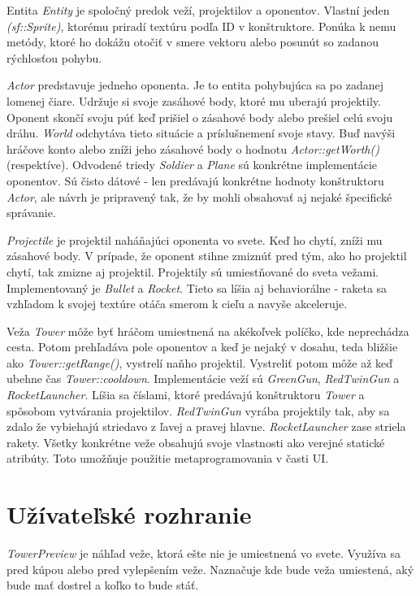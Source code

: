 \documentclass[12pt]{article}
\begin{document}
Entita \emph{Entity} je spoločný predok veží, projektilov a oponentov. Vlastní jeden \emph{(sf::Sprite)}, ktorému
priradí textúru podľa ID v konštruktore. Ponúka k nemu metódy, ktoré ho dokážu otočiť v smere vektoru alebo posunút so zadanou
rýchlosťou pohybu.


\emph{Actor} predstavuje jedneho oponenta. Je to entita pohybujúca sa po zadanej lomenej čiare. Udržuje si svoje zasáhové body, ktoré
mu uberajú projektily. Oponent skončí svoju púť keď prišiel o zásahové body alebo prešiel celú svoju dráhu. \emph{World} odchytáva tieto
situácie a príslušnemení svoje stavy. Buď navýši hráčove konto alebo zníži jeho zásahové body o hodnotu \emph{Actor::getWorth()} (respektíve).
Odvodené triedy \emph{Soldier} a \emph{Plane} sú konkrétne implementácie oponentov. Sú čisto dátové - len predávajú konkrétne hodnoty 
konštruktoru \emph{Actor}, ale návrh je pripravený tak, že by mohli obsahovať aj nejaké špecifické správanie.


\emph{Projectile} je projektil naháňajúci oponenta vo svete. Keď ho chytí, zníži mu zásahové body. V prípade, že oponent stihne zmiznúť
pred tým, ako ho projektil chytí, tak zmizne aj projektil. Projektily sú umiestňované do sveta vežami.
Implementovaný je \emph{Bullet} a \emph{Rocket}. Tieto sa líšia aj behaviorálne - raketa sa vzhľadom k svojej textúre otáča smerom k cieľu
a navyše akceleruje.


Veža \emph{Tower} môže byť hráčom umiestnená na akékoľvek políčko, kde neprechádza cesta. Potom prehľadáva pole oponentov
a keď je nejaký v dosahu, teda bližšie ako \emph{Tower::getRange()}, vystrelí naňho projektil. Vystreliť potom môže až keď
ubehne čas \emph{Tower::cooldown}. Implementácie veží sú \emph{GreenGun}, \emph{RedTwinGun} a \emph{RocketLauncher}. Líšia sa
číslami, ktoré predávajú konštruktoru \emph{Tower} a spôsobom vytvárania projektilov. \emph{RedTwinGun} vyrába projektily tak,
aby sa zdalo že vybiehajú striedavo z ľavej a pravej hlavne. \emph{RocketLauncher} zase striela rakety.
Všetky konkrétne veže obsahujú svoje vlastnosti ako verejné statické atribúty. Toto umožňuje použitie metaprogramovania v časti UI.

\section{Užívateľské rozhranie}

\emph{TowerPreview} je náhľad veže, ktorá ešte nie je umiestnená vo svete. Využíva sa pred kúpou alebo pred vylepšením veže.
Naznačuje kde bude veža umiestená, aký bude mať dostrel a koľko to bude stáť.
\end{document}
